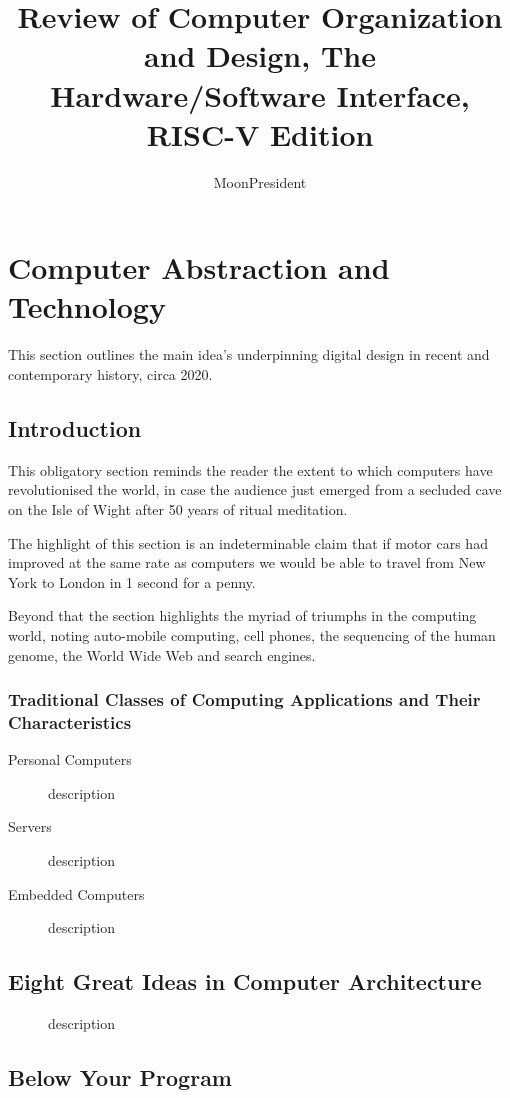 \documentclass{article}
\title{Review of Computer Organization and Design, The Hardware/Software Interface, RISC-V Edition}
\author{MoonPresident}
\begin{document}
	\maketitle
	\tableofcontents
	
	\section{Computer Abstraction and Technology}
	This section outlines the main idea's underpinning digital design in recent and contemporary history, circa 2020.
		\subsection{Introduction}
			This obligatory section reminds the reader the extent to which computers have revolutionised the world, in case the audience just emerged from a secluded cave on the Isle of Wight after 50 years of ritual meditation. 
			
			The highlight of this section is an indeterminable claim that if motor cars had improved at the same rate as computers we would be able to travel from New York to London in 1 second for a penny.
			
			Beyond that the section highlights the myriad of triumphs in the computing world, noting auto-mobile computing, cell phones, the sequencing of the human genome, the World Wide Web and search engines.
			
			\subsubsection{Traditional Classes of Computing Applications and Their Characteristics}
			\begin{description}
				\item[Personal Computers] description
				\item[Servers] description
				\item[Embedded Computers] description
			\end{description}
			

		\subsection{Eight Great Ideas in Computer Architecture}
			\begin{description}
				\item[] description
			\end{description}
		\subsection{Below Your Program}
		
\end{document}
